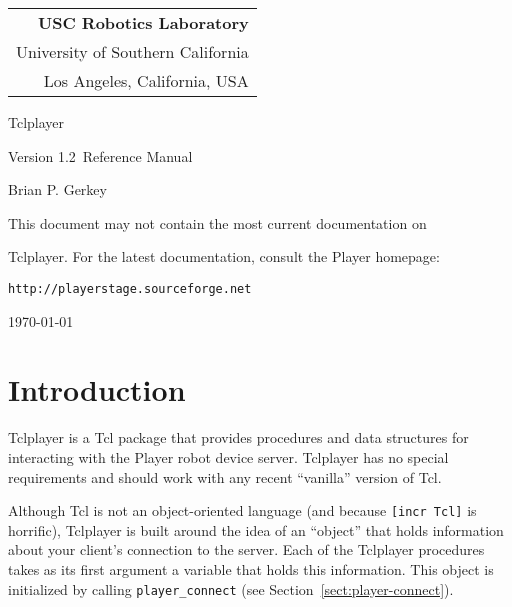 \documentclass[11pt]{article}
\def\VERSION {1.2}
\def\HOMEPAGE {{\tt http://playerstage.sourceforge.net}}
\begin{document}
\setcounter{page}{0}

\titlepage

\begin{flushright}
\begin{tabular}{r}
{\bf USC Robotics Laboratory}\\
University of Southern California\\
Los Angeles, California, USA\\
\end{tabular}
\end{flushright}

\vspace{5cm}
\centerline{\huge{Tclplayer}}
\vspace{0.5cm}
\centerline{\large{Version \VERSION\ Reference Manual}}
\vspace{2cm}

\centerline{\large Brian P. Gerkey}
\vspace{1cm}

\centerline{This document may not contain the most current documentation on}
\centerline{Tclplayer.  For the latest documentation, consult the Player 
homepage:}
\centerline{\HOMEPAGE}

\vspace{4cm}

\centerline{\today}

\newpage
\tableofcontents
\newpage

\setcounter{page}{0}
\section{Introduction}
Tclplayer is a Tcl package that provides procedures and data structures for
interacting with the Player robot device server.  Tclplayer has no special
requirements and should work with any recent ``vanilla'' version of Tcl.

Although Tcl is not an object-oriented language (and because {\tt [incr
Tcl]} is horrific), Tclplayer is built around the idea of an ``object'' that
holds information about your client's connection to the server.  Each of the
Tclplayer procedures takes as its first argument a variable that holds this
information.  This object is initialized by calling {\tt player\_connect}
(see Section~\ref{sect:player-connect}).  
\end{document}
